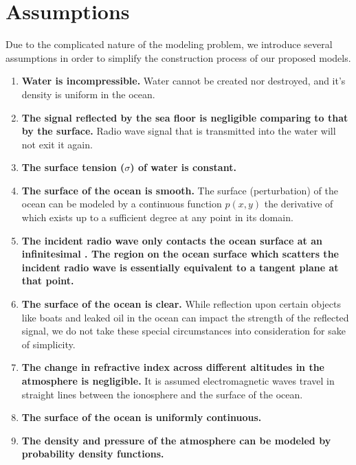 \documentclass{article}
\begin{document}
\section{Assumptions}
Due to the complicated nature of the modeling problem, we introduce several assumptions in order to simplify the construction process of our proposed models.
\begin{enumerate}
    \item \textbf{Water is incompressible.} Water cannot be created nor destroyed, and it's density is uniform in the ocean.
    \item \textbf{The signal reflected by the sea floor is negligible comparing to that by the surface.} Radio wave signal that is transmitted into the water will not exit it again.
    \item \textbf{The surface tension ($\sigma$) of water is constant.}
    \item \textbf{The surface of the ocean is smooth.} The surface (perturbation) of the ocean can be modeled by a continuous function $p(x,y)$ the derivative of which exists up to a sufficient degree at any point in its domain.
    \item \label{apt:tangent} \textbf{The incident radio wave only contacts the ocean surface at an infinitesimal . The region on the ocean surface which scatters the incident radio wave is essentially equivalent to a tangent plane at that point.}
    \item \textbf{The surface of the ocean is clear.} While reflection upon certain objects like boats and leaked oil in the ocean can impact the strength of the reflected signal, we do not take these special circumstances into consideration for sake of simplicity.
    \item \textbf{The change in refractive index across different altitudes in the atmosphere is negligible.} It is assumed electromagnetic waves travel in straight lines between the ionosphere and the surface of the ocean.
    \item \textbf{The surface of the ocean is uniformly continuous.}
    \item \textbf{The density and pressure of the atmosphere can be modeled by probability density functions.}
\end{enumerate}
\end{document}
